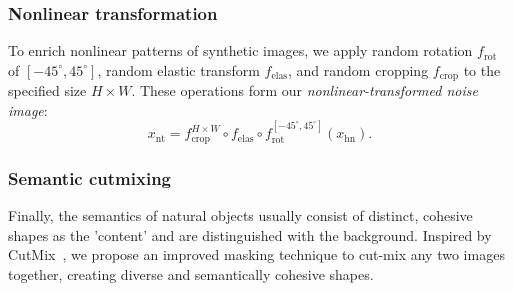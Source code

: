\subsubsection{Nonlinear transformation} \label{sssec:03-framework-synthesis-nonlintrans}
\begin{foldable} %
    To enrich nonlinear patterns of synthetic images, we apply random rotation $f_{\text{rot}}$ of $\left[-45^{\circ},45^{\circ}\right]$, random elastic transform $f_{\text{elas}}$, and random cropping $f_{\text{crop}}$ to the specified size $H\times W$.
    These operations form our \textit{nonlinear-transformed noise image}:
    \begin{equation} \label{eq:synthesis-nonlintrans}
        x_{\text{nt}}=f_{\text{crop}}^{H\times W} \circ f_{\text{elas}} \circ f_{\text{rot}}^{\left[-45^{\circ},45^{\circ}\right]}\left(x_{\text{hn}}\right).
    \end{equation}
\end{foldable}

\subsubsection{Semantic cutmixing} \label{sssec:03-framework-synthesis-semcutmix}
\begin{foldable} %
    Finally, the semantics of natural objects usually consist of distinct, cohesive shapes as the 'content' and are distinguished with the background.
    Inspired by CutMix~\cite{yun2019cutmix}, we propose an improved masking technique to cut-mix any two images together, creating diverse and semantically cohesive shapes.
\end{foldable}

